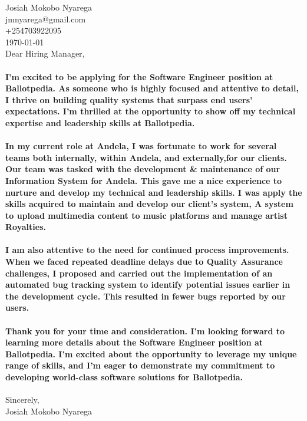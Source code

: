 \documentclass{article}
\begin{document}
\begin{flushleft}
Josiah Mokobo Nyarega\\
jmnyarega@gmail.com\\
+254703922095\\
\today\\

\vspace*{1\baselineskip}
Dear Hiring Manager,
\end{flushleft}

\paragraph{I'm excited to be applying for the Software Engineer position at Ballotpedia. As someone who is highly focused and attentive to detail, I thrive on building quality systems that surpass end users' expectations. I'm thrilled at the opportunity to show off my technical expertise and leadership skills at Ballotpedia.}

\paragraph{In my current role at Andela, I was fortunate to work for several teams both internally, within Andela, and externally,for our clients. Our team was tasked with the development \& maintenance of our Information System for Andela. This gave me a nice experience to nurture and develop my technical and leadership skills. I was apply the skills acquired to maintain and develop our client's system, A system to upload multimedia content to music platforms and manage artist Royalties.}

\paragraph{I am also attentive to the need for continued process improvements. When we faced repeated deadline delays due to Quality Assurance challenges, I proposed and carried out the implementation of an automated bug tracking system to identify potential issues earlier in the development cycle. This resulted in fewer bugs reported by our users.}

\paragraph{Thank you for your time and consideration. I'm looking forward to learning more details about the Software Engineer position at Ballotpedia. I'm excited about the opportunity to leverage my unique range of skills, and I'm eager to demonstrate my commitment to developing world-class software solutions for Ballotpedia.}

\begin{flushleft}
Sincerely,\\
Josiah Mokobo Nyarega\\
\end{flushleft}
\end{document}
